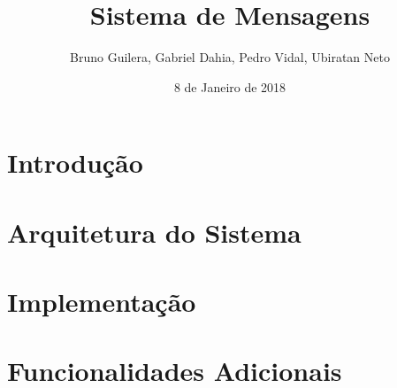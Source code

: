 \documentclass{article}
\title{Sistema de Mensagens}
\author{Bruno Guilera, Gabriel Dahia, Pedro Vidal, Ubiratan Neto}
\date{8 de Janeiro de 2018}
\begin{document}
 
\maketitle
 
\section{Introdução} \label{sec:intro}
 


\section{Arquitetura do Sistema} \label{sec:arc}



\section{Implementação} \label{sec:impl}


 
\section{Funcionalidades Adicionais} \label{sec:feat}
 

 
\end{document}

